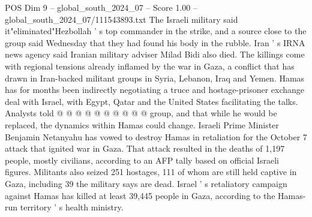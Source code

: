 \begin{textsample}{POS Dim 9 – global\_south\_2024\_07 – Score 1.00 – global\_south\_2024\_07/111543893.txt}
The Israeli military said it"eliminated"Hezbollah ' s top commander in the strike, and a source close to the group said Wednesday that they had found his body in the rubble.
Iran ' s IRNA news agency said Iranian military adviser Milad Bidi also died.
The killings come with regional tensions already inflamed by the war in Gaza, a conflict that has drawn in Iran-backed militant groups in Syria, Lebanon, Iraq and Yemen.
Hamas has for months been indirectly negotiating a truce and hostage-prisoner exchange deal with Israel, with Egypt, Qatar and the United States facilitating the talks.
Analysts told @ @ @ @ @ @ @ @ @ @ group, and that while he would be replaced, the dynamics within Hamas could change.
Israeli Prime Minister Benjamin Netanyahu has vowed to destroy Hamas in retaliation for the October 7 attack that ignited war in Gaza.
That attack resulted in the deaths of 1,197 people, mostly civilians, according to an AFP tally based on official Israeli figures.
Militants also seized 251 hostages, 111 of whom are still held captive in Gaza, including 39 the military says are dead.
Israel ' s retaliatory campaign against Hamas has killed at least 39,445 people in Gaza, according to the Hamas-run territory ' s health ministry.

\end{textsample}
